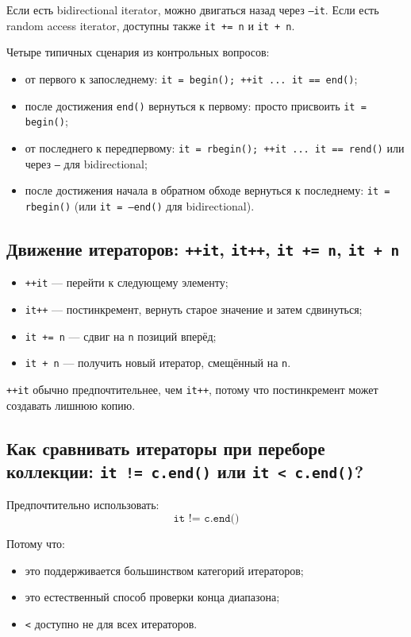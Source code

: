 Если есть bidirectional iterator, можно двигаться назад через \texttt{--it}.  
Если есть random access iterator, доступны также \texttt{it += n} и \texttt{it + n}.

Четыре типичных сценария из контрольных вопросов:
\begin{itemize}
    \item от первого к запоследнему: \texttt{it = begin(); ++it ... it == end()};
    \item после достижения \texttt{end()} вернуться к первому: просто присвоить \texttt{it = begin()};
    \item от последнего к передпервому: \texttt{it = rbegin(); ++it ... it == rend()} или через \texttt{--} для bidirectional;
    \item после достижения начала в обратном обходе вернуться к последнему: \texttt{it = rbegin()} (или \texttt{it = --end()} для bidirectional).
\end{itemize}

\subsection{Движение итераторов: \texttt{++it}, \texttt{it++}, \texttt{it += n}, \texttt{it + n}}
\begin{itemize}
    \item \texttt{++it} — перейти к следующему элементу;
    \item \texttt{it++} — постинкремент, вернуть старое значение и затем сдвинуться;
    \item \texttt{it += n} — сдвиг на \texttt{n} позиций вперёд;
    \item \texttt{it + n} — получить новый итератор, смещённый на \texttt{n}.
\end{itemize}

\begin{remark}
\texttt{++it} обычно предпочтительнее, чем \texttt{it++}, потому что постинкремент может создавать лишнюю копию.
\end{remark}

\subsection{Как сравнивать итераторы при переборе коллекции: \texttt{it != c.end()} или \texttt{it < c.end()}?}
Предпочтительно использовать:
\[
\texttt{it != c.end()}
\]

Потому что:
\begin{itemize}
    \item это поддерживается большинством категорий итераторов;
    \item это естественный способ проверки конца диапазона;
    \item \texttt{<} доступно не для всех итераторов.
\end{itemize}

